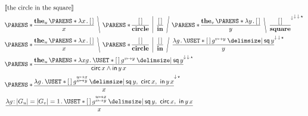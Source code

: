 \documentclass[10pt,fleqn]{article}
\begin{document}
\begin{minipage}[t]{0.6\textwidth}
\begin{align*}
  &
  \sv{\textrm{the circle in the square}} \\
  &
  \p{%
    \bitt{\textbf{the}_u\,\p{\l x \dt \hole}}{x}
    \BSL{%
    \p{%
      \bitt{\hole}{\textbf{circle}}
      \MSL{%
      \bitt{\hole}{\textbf{in}}
      \FSL{%
      \p{%
        \bitt{\textbf{the}_v\,\p{\l y \dt \hole}}{y}
        \BSL{%
        \bitt{\hole}{\textbf{square}}
        }
      }^{\dnar} } }
    } }
  }^{\dnar\,\dnar\,{\bind}} \\
  &
  \p{%
    \bitt{\textbf{the}_u\,\p{\l x \dt \hole}}{x}
    \BSL{%
    \p{%
      \bitt{\hole}{\textbf{circle}}
      \MSL{%
      \bitt{\hole}{\textbf{in}}
      \FSL{%
      \bitt{%
        \l g \dt \uset{\hole\,g^{v\mapsto y} \giv \cn{sq}\,y}
      }{y}
      } }
    } }
  }^{\dnar\,\dnar\,{\bind}} \\
  &
  \p{%
    \bitt{%
      \textbf{the}_u\,\p{%
        \l xg \dt \uset{\hole\,g^{v\mapsto y} \giv \cn{sq}\,y}
      }
    }{%
      \cn{circ}\,x \land \cn{in}\,y\,x
    }
  }^{\dnar\,\dnar\,{\bind}} \\
  &
  \p{%
    \bitt{%
      \l g \dt
        \uset{%
          \hole\,g^{\substack{u\mapsto x\\ v\mapsto y}}
        \giv
          \cn{sq}\,y,\ \cn{circ}\,x,\ \cn{in}\,y\,x
        }
    }{x}
  }^{\dnar\,{\bind}} \\
  &
  \bitt{%
    \l g \col |G_u| = |G_v| = 1 \dt
      \uset{%
        \hole\,g^{\substack{u\mapsto x\\ v\mapsto y}}
      \giv
        \cn{sq}\,y,\ \cn{circ}\,x,\ \cn{in}\,y\,x
      }
  }{x}
\end{align*}
\end{minipage}
%
%
\end{document}
